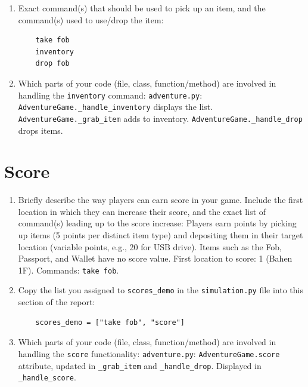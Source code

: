 \documentclass[11pt]{article}
\begin{document}
\begin{enumerate}
\begin{enumerate}
\begin{itemize}
    \item Item name: tcard
    \item Item start location ID: 6
    \item Item target location ID: 3
    \end{itemize}
    \item For Item 7 (Wallet):
    \begin{itemize}
    \item Item name: wallet
    \item Item start location ID: 7
    \item Item target location ID: 6
    \end{itemize}
\end{enumerate}

    \item Exact command(s) that should be used to pick up an item, and the command(s) used to use/drop the item:
    \begin{verbatim}
    take fob
    inventory
    drop fob
    \end{verbatim}

    \item Which parts of your code (file, class, function/method) are involved in handling the \texttt{inventory} command:
    \texttt{adventure.py}: \texttt{AdventureGame.\_handle\_inventory} displays the list. \texttt{AdventureGame.\_grab\_item} adds to inventory. \texttt{AdventureGame.\_handle\_drop} drops items.
\end{enumerate}

\section*{Score}
\begin{enumerate}

    \item Briefly describe the way players can earn score in your game. Include the first location in which they can increase their score, and the exact list of command(s) leading up to the score increase:
    Players earn points by picking up items (5 points per distinct item type) and depositing them in their target location (variable points, e.g., 20 for USB drive). Items such as the Fob, Passport, and Wallet have no score value.
    First location to score: 1 (Bahen 1F).
    Commands: \texttt{take fob}.

    \item Copy the list you assigned to \texttt{scores\_demo} in the \texttt{simulation.py} file into this section of the report:
    \begin{verbatim}
    scores_demo = ["take fob", "score"]
    \end{verbatim}

    \item Which parts of your code (file, class, function/method) are involved in handling the \texttt{score} functionality:
    \texttt{adventure.py}: \texttt{AdventureGame.score} attribute, updated in \texttt{\_grab\_item} and \texttt{\_handle\_drop}. Displayed in \texttt{\_handle\_score}.
\end{enumerate}
\end{document}
